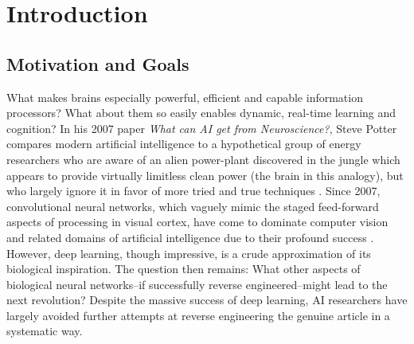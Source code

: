 \documentclass[10pt,letterpaper]{article}
\begin{document}

\section*{Introduction}

\subsection*{Motivation and Goals}
\label{MotsAndGoals}

What makes brains especially powerful, efficient and capable information processors? What about them so easily enables dynamic, real-time learning and cognition? In his 2007 paper \emph{What can AI get from Neuroscience?}, Steve Potter compares modern artificial intelligence to a hypothetical group of energy researchers who are aware of an alien power-plant discovered in the jungle which appears to provide virtually limitless clean power (the brain in this analogy), but who largely ignore it in favor of more tried and true techniques \cite{potter2007can}. Since 2007, convolutional neural networks, which vaguely mimic the staged feed-forward aspects of processing in visual cortex, have come to dominate computer vision and related domains of artificial intelligence due to their profound success \cite{krizhevsky2012imagenet}\cite{ILSVRC2016}. However, deep learning, though impressive, is a crude approximation of its biological inspiration. The question then remains: What other aspects of biological neural networks--if successfully reverse engineered--might lead to the next revolution? Despite the massive success of deep learning, AI researchers have largely avoided further attempts at reverse engineering the genuine article in a systematic way. 
 
\end{document}
